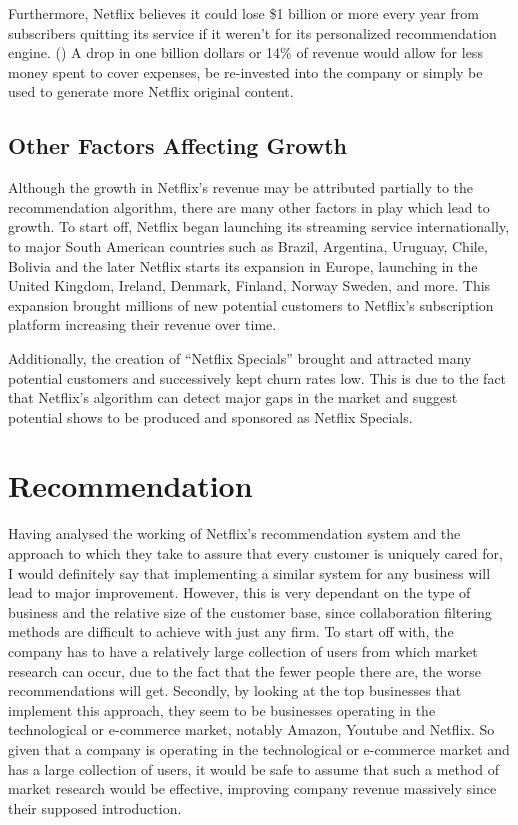 \documentclass[12pt,a4paper]{article}
\begin{document}
Furthermore, Netflix believes it could lose \$1 billion or more every year from subscribers quitting its service if it weren't for its personalized recommendation engine. (\cite{mcalone_2016}) A drop in one billion dollars or 14\% of revenue would allow for less money spent to cover expenses, be re-invested into the company or simply be used to generate more Netflix original content.

\subsection{Other Factors Affecting Growth}

Although the growth in Netflix's revenue may be attributed partially to the recommendation algorithm, there are many other factors in play which lead to growth. To start off, Netflix began launching its streaming service internationally, to major South American countries such as Brazil, Argentina, Uruguay, Chile, Bolivia and the later Netflix starts its expansion in Europe, launching in the United Kingdom, Ireland, Denmark, Finland, Norway Sweden, and more. This expansion brought millions of new potential customers to Netflix's subscription platform increasing their revenue over time.

Additionally, the creation of \enquote{Netflix Specials} brought and attracted many potential customers and successively kept churn rates low. This is due to the fact that Netflix's algorithm can detect major gaps in the market and suggest potential shows to be produced and sponsored as Netflix Specials.

\section{Recommendation}

Having analysed the working of Netflix's recommendation system and the approach to which they take to assure that every customer is uniquely cared for, I would definitely say that implementing a similar system for any business will lead to major improvement. However, this is very dependant on the type of business and the relative size of the customer base, since collaboration filtering methods are difficult to achieve with just any firm. To start off with, the company has to have a relatively large collection of users from which market research can occur, due to the fact that the fewer people there are, the worse recommendations will get. Secondly, by looking at the top businesses that implement this approach, they seem to be businesses operating in the technological or e-commerce market, notably Amazon, Youtube and Netflix. So given that a company is operating in the technological or e-commerce market and has a large collection of users, it would be safe to assume that such a method of market research would be effective, improving company revenue massively since their supposed introduction.

\medskip
\printbibliography
\end{document}
